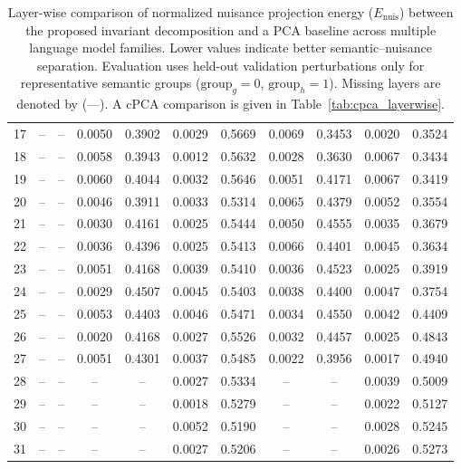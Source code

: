\begin{table}[!htbp]
\begin{tabular}{c|cc|cc|cc|cc|cc}
17 & -- & -- & 0.0050 & 0.3902 & 0.0029 & 0.5669 & 0.0069 & 0.3453 & 0.0020 & 0.3524 \\
18 & -- & -- & 0.0058 & 0.3943 & 0.0012 & 0.5632 & 0.0028 & 0.3630 & 0.0067 & 0.3434 \\
19 & -- & -- & 0.0060 & 0.4044 & 0.0032 & 0.5646 & 0.0051 & 0.4171 & 0.0067 & 0.3419 \\
20 & -- & -- & 0.0046 & 0.3911 & 0.0033 & 0.5314 & 0.0065 & 0.4379 & 0.0052 & 0.3554 \\
21 & -- & -- & 0.0030 & 0.4161 & 0.0025 & 0.5444 & 0.0050 & 0.4555 & 0.0035 & 0.3679 \\
22 & -- & -- & 0.0036 & 0.4396 & 0.0025 & 0.5413 & 0.0066 & 0.4401 & 0.0045 & 0.3634 \\
23 & -- & -- & 0.0051 & 0.4168 & 0.0039 & 0.5410 & 0.0036 & 0.4523 & 0.0025 & 0.3919 \\
24 & -- & -- & 0.0029 & 0.4507 & 0.0045 & 0.5403 & 0.0038 & 0.4400 & 0.0047 & 0.3754 \\
25 & -- & -- & 0.0053 & 0.4403 & 0.0046 & 0.5471 & 0.0034 & 0.4550 & 0.0042 & 0.4409 \\
26 & -- & -- & 0.0020 & 0.4168 & 0.0027 & 0.5526 & 0.0032 & 0.4457 & 0.0025 & 0.4843 \\
27 & -- & -- & 0.0051 & 0.4301 & 0.0037 & 0.5485 & 0.0022 & 0.3956 & 0.0017 & 0.4940 \\
28 & -- & -- & -- & -- & 0.0027 & 0.5334 & -- & -- & 0.0039 & 0.5009 \\
29 & -- & -- & -- & -- & 0.0018 & 0.5279 & -- & -- & 0.0022 & 0.5127 \\
30 & -- & -- & -- & -- & 0.0052 & 0.5190 & -- & -- & 0.0028 & 0.5245 \\
31 & -- & -- & -- & -- & 0.0027 & 0.5206 & -- & -- & 0.0026 & 0.5273 \\

\hline
\end{tabular}
\vspace{0.4em}
\caption{Layer-wise comparison of normalized nuisance projection energy ($E_{\mathrm{nuis}}$) between the proposed invariant decomposition and a PCA baseline across multiple language model families. Lower values indicate better semantic--nuisance separation. Evaluation uses held-out validation perturbations only for representative semantic groups ($\mathrm{group}_g=0$, $\mathrm{group}_h=1$). Missing layers are denoted by (---). A cPCA comparison is given in Table~\ref{tab:cpca_layerwise}. } %
\label{tab:full_layerwise}
\vspace{-1.0em}
\end{table}


